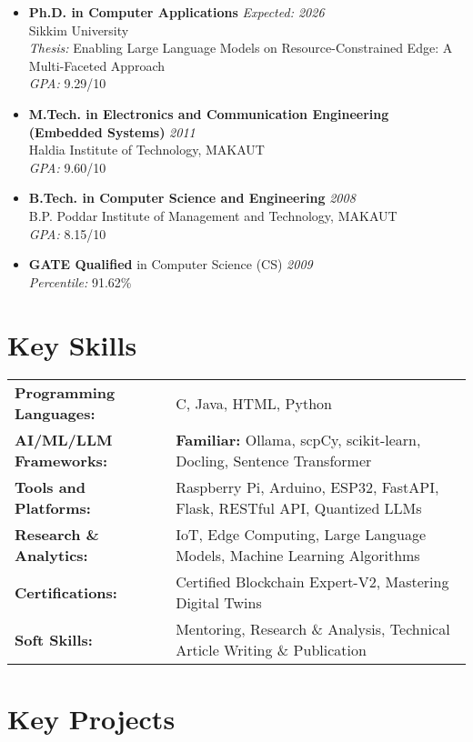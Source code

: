 \documentclass[10pt,a4paper]{article}
\begin{document}
	\begin{itemize}[leftmargin=0.15in]
		\item \textbf{Ph.D. in Computer Applications} \hfill \textit{Expected: 2026}\\
		Sikkim University \\
		\textit{Thesis:} Enabling Large Language Models on Resource-Constrained Edge: A Multi-Faceted Approach \\
		\textit{GPA:} 9.29/10
		\item \textbf{M.Tech. in Electronics and Communication Engineering (Embedded Systems)} \hfill \textit{2011}\\
		Haldia Institute of Technology, MAKAUT \\
		\textit{GPA:} 9.60/10
		\item \textbf{B.Tech. in Computer Science and Engineering} \hfill \textit{2008}\\
		B.P. Poddar Institute of Management and Technology, MAKAUT \\
		\textit{GPA:} 8.15/10
		\item \textbf{GATE Qualified} in Computer Science (CS) \hfill \textit{2009}\\
		\textit{Percentile:} 91.62\%
	\end{itemize}
	
	\section*{Key Skills}
	
	\begin{tabular}{ll}
		\textbf{Programming Languages:} &  C, Java, HTML, Python \\
		\textbf{AI/ML/LLM Frameworks:} & \textbf{Familiar:} Ollama, scpCy, scikit-learn, Docling, Sentence Transformer\\
		\textbf{Tools and Platforms:} & Raspberry Pi, Arduino, ESP32,  FastAPI, Flask, RESTful API, Quantized LLMs \\
		\textbf{Research \& Analytics:} & IoT, Edge Computing, Large Language Models, Machine Learning Algorithms \\
		\textbf{Certifications:} & Certified Blockchain Expert-V2, Mastering Digital Twins \\
		\textbf{Soft Skills:} & Mentoring, Research \& Analysis, Technical Article Writing \& Publication \\
	\end{tabular}
	
	
	\section*{Key Projects}
\end{document}
